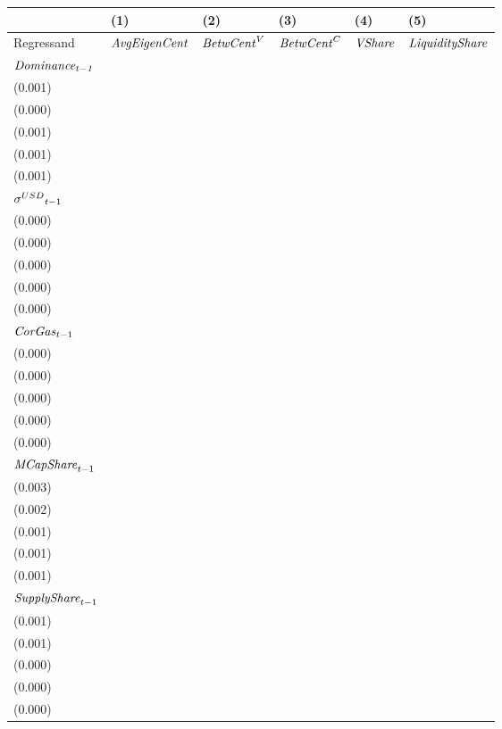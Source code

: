 \begin{tabular}{llllll}
\toprule
{} &                                   (1) &                                   (2) &                                   (3) &                                   (4) &                                   (5) \\
\midrule
Regressand                   &                  ${\it AvgEigenCent}$ &                    ${\it BetwCent}^V$ &                    ${\it BetwCent}^C$ &                        ${\it VShare}$ &                ${\it LiquidityShare}$ \\
$\it Dominance_{t-1}$        &   \makecell{$0.846^{***}$ \\ (0.001)} &   \makecell{$0.967^{***}$ \\ (0.000)} &   \makecell{$0.960^{***}$ \\ (0.001)} &   \makecell{$0.902^{***}$ \\ (0.001)} &   \makecell{$0.929^{***}$ \\ (0.001)} \\
${{\it \sigma}^{USD}}_{t-1}$ &      \makecell{$0.000^{}$ \\ (0.000)} &      \makecell{$0.000^{}$ \\ (0.000)} &      \makecell{$0.000^{}$ \\ (0.000)} &     \makecell{$-0.000^{}$ \\ (0.000)} &     \makecell{$-0.000^{}$ \\ (0.000)} \\
${{\it CorGas}}_{t-1}$       &     \makecell{$-0.000^{}$ \\ (0.000)} &     \makecell{$-0.000^{}$ \\ (0.000)} &     \makecell{$-0.000^{}$ \\ (0.000)} &     \makecell{$-0.000^{}$ \\ (0.000)} &     \makecell{$-0.000^{}$ \\ (0.000)} \\
${{\it MCapShare}}_{t-1}$    &   \makecell{$0.015^{***}$ \\ (0.003)} &   \makecell{$0.051^{***}$ \\ (0.002)} &   \makecell{$0.049^{***}$ \\ (0.001)} &   \makecell{$0.039^{***}$ \\ (0.001)} &   \makecell{$0.047^{***}$ \\ (0.001)} \\
${{\it SupplyShare}}_{t-1}$  &   \makecell{$0.034^{***}$ \\ (0.001)} &   \makecell{$0.003^{***}$ \\ (0.001)} &   \makecell{$0.002^{***}$ \\ (0.000)} &   \makecell{$0.012^{***}$ \\ (0.000)} &      \makecell{$0.000^{}$ \\ (0.000)} \\

\end{tabular}
